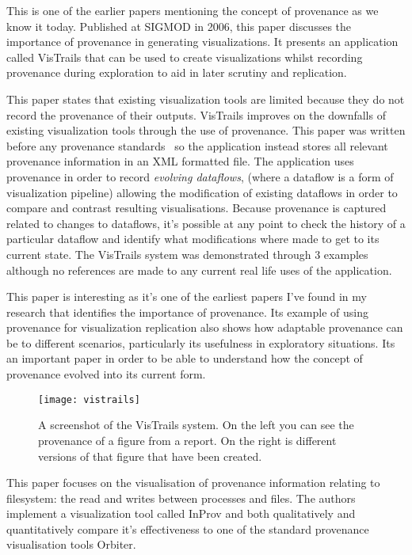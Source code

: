 
This is one of the earlier papers mentioning the concept of provenance as we know it today. Published at SIGMOD in 2006, this paper discusses the importance of provenance in generating visualizations. It presents an application called VisTrails that can be used to create visualizations whilst recording provenance during exploration to aid in later scrutiny and replication.

This paper states that existing visualization tools are limited because they do not record the provenance of their outputs. VisTrails improves on the downfalls of existing visualization tools through the use of provenance. This paper was written before any provenance standards~\cite{Macko2012} so the application instead stores all relevant provenance information in an XML formatted file. The application uses provenance in order to record \textit{evolving dataflows}, (where a dataflow is a form of visualization pipeline) allowing the modification of existing dataflows in order to compare and contrast resulting visualisations. Because provenance is captured related to changes to dataflows, it's possible at any point to check the history of a particular dataflow and identify what modifications where made to get to its current state. The VisTrails system was demonstrated through 3 examples although no references are made to any current real life uses of the application.

This paper is interesting as it's one of the earliest papers I've found in my research that identifies the importance of provenance. Its example of using provenance for visualization replication also shows how adaptable provenance can be to different scenarios, particularly its usefulness in exploratory situations. Its an important paper in order to be able to understand how the concept of provenance evolved into its current form.

\begin{figure}[h]
	\centering
	\texttt{[image: vistrails]}
	\caption{A screenshot of the VisTrails system. On the left you can see the provenance of a figure from a report. On the right is different versions of that figure that have been created.}
	\label{fig:vistrails}
\end{figure}


This paper focuses on the visualisation of provenance information relating to filesystem: the read and writes between processes and files. The authors implement a visualization tool called InProv and both qualitatively and quantitatively compare it's effectiveness to one of the standard provenance visualisation tools Orbiter\cite{Seltzer2011}.

